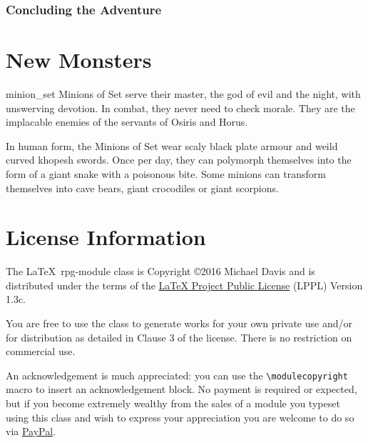 \documentclass[a4paper,serif]{rpg-module}
\begin{document}
\noindent\lipsum[12-14]

\section{Concluding the Adventure}

\lipsum[12-13]

\newpage

%
%

\part{New Monsters}


\begin{newmonster}{minion_set}\label{minion_set}%
Minions of Set serve their master, the god of evil and the night, with unswerving devotion. In combat, they
never need to check morale. They are the implacable enemies of the servants of Osiris and Horus.

In human form, the Minions of Set wear scaly black plate armour and weild curved khopesh swords. Once per
day, they can polymorph themselves into the form of a giant snake with a poisonous bite. Some minions can
transform themselves into cave bears, giant crocodiles or giant scorpions.
\end{newmonster}

\part{License Information}

The \LaTeX~rpg-module class is Copyright \copyright 2016 Michael Davis and is distributed under the terms of the
\href{http://www.latex-project.org/lppl.txt}{LaTeX Project Public License} (LPPL) Version 1.3c.

You are free to use the class to generate works for your own private use and/or for distribution as detailed in
Clause 3 of the license. There is no restriction on commercial use.

An acknowledgement is much appreciated: you can use the \verb|\modulecopyright| macro to insert an acknowledgement
block. No payment is required or expected, but if you become extremely wealthy from the sales of a module
you typeset using this class and wish to express your appreciation you are welcome to do so via
\href{https://paypal.me/slithy}{PayPal}.
\end{document}
